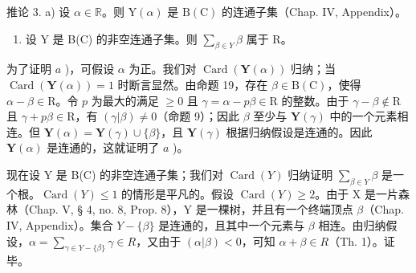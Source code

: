 推论 3. a) 设 \(\alpha \in \mathbb{R}\)。则 \(\mathrm{Y}(\alpha)\) 是 \(\mathrm{B}(\mathrm{C})\) 的连通子集（Chap. IV, Appendix）。

\begin{enumerate}
\def\labelenumi{\alph{enumi})}
\setcounter{enumi}{1}
\tightlist
\item
  设 Y 是 B(C) 的非空连通子集。则 \(\sum_{\beta\in Y}\beta\) 属于 R。
\end{enumerate}

为了证明 \(a\) )，可假设 \(\alpha\) 为正。我们对 \(\operatorname{Card}(\mathbf{Y}(\alpha))\) 归纳；当 \(\operatorname{Card}(\mathbf{Y}(\alpha)) = 1\) 时断言显然。由命题 19，存在 \(\beta \in \mathrm{B}(\mathrm{C})\)，使得 \(\alpha - \beta \in \mathrm{R}\)。令 \(p\) 为最大的满足 \(\geqslant 0\) 且 \(\gamma = \alpha - p\beta \in \mathrm{R}\) 的整数。由于 \(\gamma - \beta \notin \mathrm{R}\) 且 \(\gamma + p\beta \in \mathrm{R}\)，有 \((\gamma|\beta) \neq 0\)（命题 9）；因此 \(\beta\) 至少与 \(\mathbf{Y}(\gamma)\) 中的一个元素相连。但 \(\mathbf{Y}(\alpha) = \mathbf{Y}(\gamma) \cup \{\beta\}\)，且 \(\mathbf{Y}(\gamma)\) 根据归纳假设是连通的。因此 \(\mathbf{Y}(\alpha)\) 是连通的，这就证明了 \(a\) )。

现在设 Y 是 B(C) 的非空连通子集；我们对 \(\operatorname{Card}(Y)\) 归纳证明 \(\sum_{\beta\in Y}\beta\) 是一个根。\(\operatorname{Card}(Y)\leqslant1\) 的情形是平凡的。假设 \(\operatorname{Card}(Y)\geqslant2\)。由于 X 是一片森林（Chap. V, § 4, no. 8, Prop. 8），Y 是一棵树，并且有一个终端顶点 \(\beta\)（Chap. IV, Appendix）。集合 \(Y-\{\beta\}\) 是连通的，且其中一个元素与 \(\beta\) 相连。由归纳假设，\(\alpha=\sum_{\gamma\in Y-\{\beta\}}\gamma\in R\)，又由于 \((\alpha|\beta)<0\)，可知 \(\alpha+\beta\in R\)（Th. 1）。证毕。

